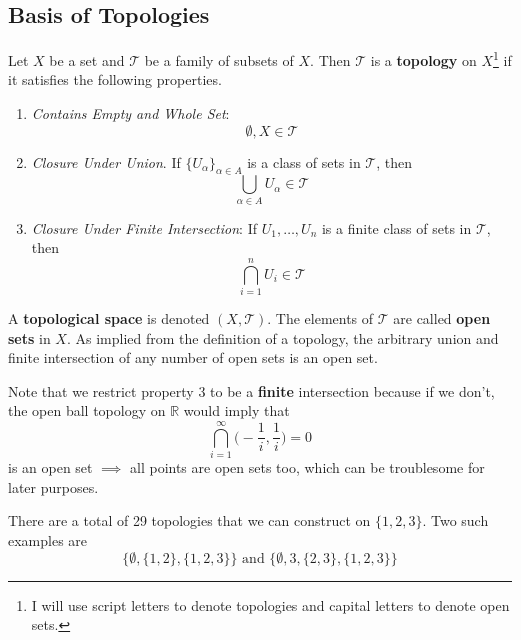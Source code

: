 \documentclass{article}
\begin{document}
  \subsection{Basis of Topologies}

    \begin{definition}[Topology]
      Let $X$ be a set and $\mathscr{T}$ be a family of subsets of $X$. Then $\mathscr{T}$ is a \textbf{topology} on $X$\footnote{I will use script letters to denote topologies and capital letters to denote open sets.} if it satisfies the following properties. 
      \begin{enumerate}
        \item \textit{Contains Empty and Whole Set}: 
        \begin{equation}
          \emptyset, X \in \mathscr{T}
        \end{equation}

        \item \textit{Closure Under Union}. If $\{U_\alpha\}_{\alpha \in A}$ is a class of sets in $\mathscr{T}$, then 
        \begin{equation}
          \bigcup_{\alpha \in A} U_\alpha \in \mathscr{T}
        \end{equation}

        \item \textit{Closure Under Finite Intersection}: If $U_1, \ldots, U_n$ is a finite class of sets in $\mathscr{T}$, then 
        \begin{equation}
         \bigcap_{i=1}^{n} U_i \in \mathscr{T}
        \end{equation}
      \end{enumerate}
      A \textbf{topological space} is denoted $(X, \mathscr{T})$. The elements of $\mathscr{T}$ are called \textbf{open sets} in $X$. As implied from the definition of a topology, the arbitrary union and finite intersection of any number of open sets is an open set. 
    \end{definition}

    Note that we restrict property 3 to be a \textbf{finite} intersection because if we don't, the open ball topology on $\mathbb{R}$ would imply that 
    \[ \bigcap_{i = 1}^{\infty} \Big( - \frac{1}{i}, \frac{1}{i} \Big) = 0\]
    is an open set $\implies$ all points are open sets too, which can be troublesome for later purposes. 

    \begin{example}
    There are a total of 29 topologies that we can construct on $\{1, 2, 3\}$. Two such examples are 
    \[\{\emptyset, \{1, 2\}, \{1, 2, 3\}\} \text{ and } \{\emptyset, 3, \{2, 3\}, \{1, 2, 3\}\}\]
    \end{example}
\end{document}
